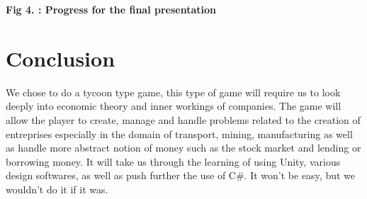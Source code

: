 \documentclass[a4paper, 11pt] {article}
\begin{document}
\begin{center}
    \bf{Fig 4. : Progress for the final presentation}
\end{center}

\newpage

\section{Conclusion}

\par
 We chose to do a tycoon type game, this type of game will require us to look deeply into economic theory and inner workings of companies. The game will allow the player to create, manage and handle problems related to the creation of entreprises especially in the domain of transport, mining, manufacturing as well as handle more abstract notion of money such as the stock market and lending or borrowing money. It will take us through the learning of using Unity, various design softwares, as well
 as push further the use of C\#. It won’t be easy, but we wouldn’t do it if it was.\par
\end{document}
